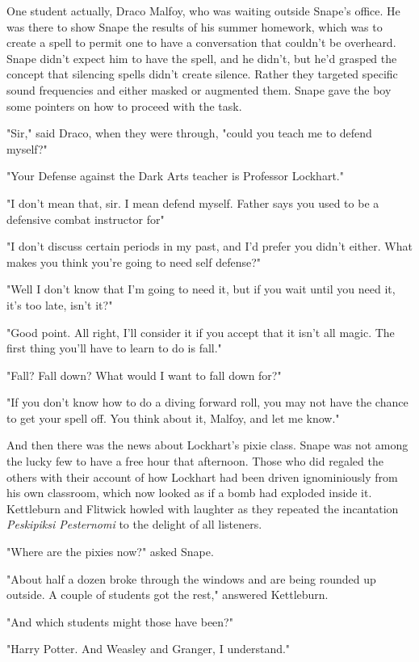 One student actually, Draco Malfoy, who was waiting outside Snape's office. He was there to show Snape the results of his summer homework, which was to create a spell to permit one to have a conversation that couldn't be overheard. Snape didn't expect him to have the spell, and he didn't, but he'd grasped the concept that silencing spells didn't create silence. Rather they targeted specific sound frequencies and either masked or augmented them. Snape gave the boy some pointers on how to proceed with the task.

"Sir," said Draco, when they were through, "could you teach me to defend myself?"

"Your Defense against the Dark Arts teacher is Professor Lockhart."

"I don't mean that, sir. I mean defend myself. Father says you used to be a defensive combat instructor for{\el}"

"I don't discuss certain periods in my past, and I'd prefer you didn't either. What makes you think you're going to need self defense?"

"Well I don't know that I'm going to need it, but if you wait until you need it, it's too late, isn't it?"

"Good point. All right, I'll consider it if you accept that it isn't all magic. The first thing you'll have to learn to do is fall."

"Fall? Fall down? What would I want to fall down for?"

"If you don't know how to do a diving forward roll, you may not have the chance to get your spell off. You think about it, Malfoy, and let me know."

And then there was the news about Lockhart's pixie class. Snape was not among the lucky few to have a free hour that afternoon. Those who did regaled the others with their account of how Lockhart had been driven ignominiously from his own classroom, which now looked as if a bomb had exploded inside it. Kettleburn and Flitwick howled with laughter as they repeated the incantation \emph{Peskipiksi Pesternomi} to the delight of all listeners.

"Where are the pixies now?" asked Snape.

"About half a dozen broke through the windows and are being rounded up outside. A couple of students got the rest," answered Kettleburn.

"And which students might those have been?"

"Harry Potter. And Weasley and Granger, I understand."

